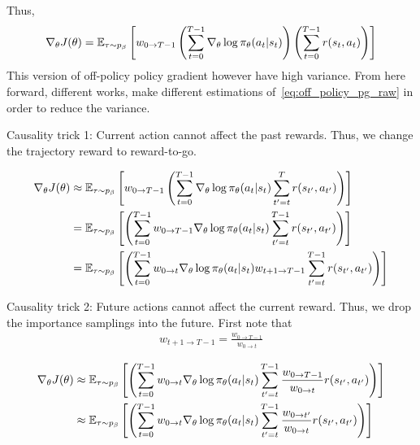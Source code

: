 \documentclass{article}
\begin{document}
Thus,
\begin{align}\label{eq:off_policy_pg_raw}
    \nabla_\theta J(\theta) = {\mathbb E}_{\tau \sim p_\beta} \left[w_{0 \to {T-1}} \left(\sum_{t=0}^{T-1} \nabla_\theta \log \pi_\theta(a_t\vert s_t)\right) \left(\sum_{t=0}^{T-1} r(s_t, a_t)\right) \right]
\end{align}
This version of off-policy policy gradient however have high variance.
From here forward, different works, make different estimations of~\eqref{eq:off_policy_pg_raw} in order to reduce the variance.

Causality trick 1: Current action cannot affect the past rewards. Thus, we change the trajectory reward to reward-to-go.

\begin{align*}
    \nabla_\theta J(\theta) &\approx {\mathbb E}_{\tau \sim p_\beta} \left[w_{0 \to {T-1}} \left(\sum_{t=0}^{T-1} \nabla_\theta \log \pi_\theta(a_t\vert s_t) \sum_{t^\prime=t}^T r(s_{t^\prime}, a_{t^\prime})\right) \right] \\
    &= {\mathbb E}_{\tau \sim p_\beta} \left[\left(\sum_{t=0}^{T-1} w_{0 \to {T-1}} \nabla_\theta \log \pi_\theta(a_t\vert s_t) \sum_{t^\prime=t}^{T-1} r(s_{t^\prime}, a_{t^\prime})\right) \right]\\
    &= {\mathbb E}_{\tau \sim p_\beta} \left[\left(\sum_{t=0}^{T-1} w_{0\to t} \nabla_\theta \log \pi_\theta(a_t\vert s_t) w_{{t+1} \to {T-1}} \sum_{t^\prime=t}^{T-1} r(s_{t^\prime}, a_{t^\prime})\right) \right]
\end{align*}

Causality trick 2: Future actions cannot affect the current reward. Thus, we drop the importance samplings into the future. First note that
\begin{align*}
    w_{{t+1} \to {T-1}} = \frac{w_{{0} \to {T-1}}}{w_{{0} \to {t}}}
\end{align*}

\begin{align}
\nabla_\theta J(\theta) &\approx {\mathbb E}_{\tau \sim p_\beta} \left[\left(\sum_{t=0}^{T-1} w_{0\to t} \nabla_\theta \log \pi_\theta(a_t\vert s_t)  \sum_{t^\prime=t}^{T-1} \frac{w_{{0} \to {T-1}}}{w_{{0} \to {t}}} r(s_{t^\prime}, a_{t^\prime})\right) \right]\nonumber\\
&\approx {\mathbb E}_{\tau \sim p_\beta} \left[\left(\sum_{t=0}^{T-1} w_{0\to t} \nabla_\theta \log \pi_\theta(a_t\vert s_t)  \sum_{t^\prime=t}^{T-1} \frac{w_{{0} \to {t^\prime}}}{w_{{0} \to {t}}} r(s_{t^\prime}, a_{t^\prime})\right) \right] \label{eq:off_policy_pg_after_causality1}
\end{align}
\end{document}
